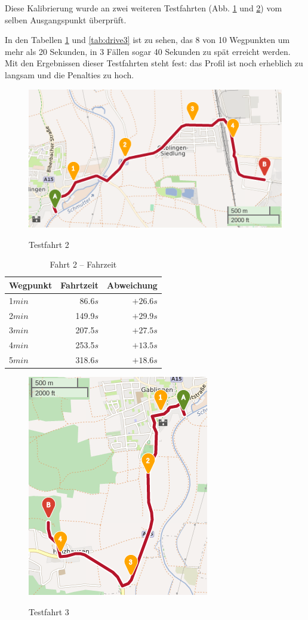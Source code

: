 Diese Kalibrierung wurde an zwei weiteren Testfahrten (Abb. \ref{fig:drive2} und \ref{fig:drive3}) vom selben Ausgangspunkt überprüft.

In den Tabellen \ref{tab:drive2} und \ref{tab:drive3} ist zu sehen, das 8 von 10 Wegpunkten um mehr als 20 Sekunden, in 3 Fällen sogar 40 Sekunden zu spät erreicht werden.
Mit den Ergebnissen dieser Testfahrten steht fest: das Profil ist noch erheblich zu langsam und die Penalties zu hoch.

\begin{figure}[h]
\centering
\caption{Testfahrt 2}
\label{fig:drive2}
\includegraphics[width = 0.70 \textwidth]{../media/Fahrt2crop.png} \\
\end{figure}

\begin{table}[]
\centering
\caption{Fahrt 2 -- Fahrzeit}
\label{tab:drive2}
\begin{tabular}{|l|r|r|}
\hline
Wegpunkt & Fahrtzeit & Abweichung \\ \hline 
1$min$ & 86.6$s$ & $+26.6s$ \\
2$min$ & 149.9$s$ & $+29.9s$ \\
3$min$ & 207.5$s$ & $+27.5s$ \\
4$min$ & 253.5$s$ & $+13.5s$ \\
5$min$ & 318.6$s$ & $+18.6s$ \\
\hline
\end{tabular}
\end{table}


\begin{figure}[h]
\centering
\caption{Testfahrt 3}
\label{fig:drive3}
\includegraphics[width = 0.40 \textwidth]{../media/Fahrt3crop.png} \\
\end{figure}

